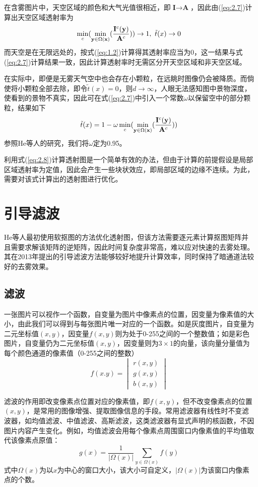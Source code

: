 \documentclass[a4paper, 12pt, oneside]{report}
\begin{document}
{在含雾图片中，天空区域的颜色和大气光值很相近，即$\textbf{I} \rightarrow \textbf{A}$，因此由(\ref{eq:2.7})计算出天空区域透射率为
$$\min_c(\min_{{\bf y} \in \Omega({\bf x})}(\frac{{\bf I}^c({\bf y})}{{\bf A}^c})) \rightarrow 1,\ \tilde{t}(x) \rightarrow 0$$
而天空是在无限远处的，按式(\ref{eq:1.2})计算得其透射率应当为0，这一结果与式(\ref{eq:2.7})计算结果一致，因此计算透射率时无需区分开天空区域和非天空区域。

在实际中，即便是无雾天气空中也会存在小颗粒，在远眺时图像仍会被降质。而倘使将小颗粒全部去除，即令$\tilde{t}(x) = 0$，则$d \rightarrow \infty$，人眼无法感知图中景物深度，使看到的景物不真实，因此可在式(\ref{eq:2.7})中引入一个常数$\omega$以保留空中的部分颗粒，结果如下
\begin{equation} \label{eq:2.8}
\tilde{t}(x) = 1 - \omega\min_c(\min_{{\bf y} \in \Omega({\bf x})}(\frac{{\bf I}^c({\bf y})}{{\bf A}^c}))
\end{equation}
参照He等人的研究，我们将$\omega$定为0.95。

利用式(\ref{eq:2.8})计算透射图是一个简单有效的办法，但由于计算的前提假设是局部区域透射率为定值，因此会产生一些块状效应，即局部区域的边缘不连续。为此，需要对该式计算出的透射图进行优化。

\section{引导滤波\quad}
He等人最初使用软抠图的方法优化透射图，但该方法需要逐元素计算抠图矩阵并且需要求解该矩阵的逆矩阵，因此时间复杂度非常高，难以应对快速的去雾处理。其在2013年提出的引导滤波\cite{ref13}方法能够较好地提升计算效率，同时保持了暗通道法较好的去雾效果。

\subsection{滤波\quad}
一张图片可以视作一个函数，自变量为图片中像素点的位置，因变量为像素值的大小，由此我们可以得到与每张图片唯一对应的一个函数。如是灰度图片，自变量为二元坐标值$(x, y)$，因变量$f(x, y)$则为处于0-255之间的一个整数值；如是彩色图片，自变量仍为二元坐标值$(x, y)$，因变量则为$3\times 1$的向量，该向量分量值为每个颜色通道的像素值（0-255之间的整数）
$$ f(x. y) = 
\begin{vmatrix}
  r(x, y) \\
  g(x, y) \\
  b(x, y)  
\end{vmatrix}
$$

滤波的作用即改变像素点位置对应的像素值，即$f(x,y)$，但不改变像素点的位置$(x,y)$，是常用的图像增强、提取图像信息的手段。常用滤波器有线性时不变滤波器，如均值滤波、中值滤波、高斯滤波，这类滤波器有显式声明的核函数，不因图片内容产生变化。例如，均值滤波会用每个像素点周围窗口内像素值的平均值取代该像素点原值：
$$g(x) = \frac{1}{|\Omega(x)|}\sum_{y \in \Omega(x)}f(y)$$
式中$\Omega(x)$为以$x$为中心的窗口大小，该大小可自定义，$|\Omega(x)|$为该窗口内像素点的个数。

}
\end{document}

